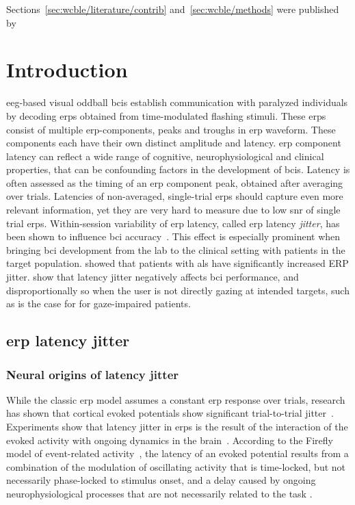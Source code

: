 Sections~\ref{sec:wcble/literature/contrib} and~\ref{sec:wcble/methods} were published
by~\textcite{VanDenKerchove2024}

\section{Introduction}
\label{sec:wcble/intro}

\Ac{eeg}-based visual oddball \acp{bci} establish communication with paralyzed
individuals by decoding \acp{erp} obtained from time-modulated flashing
stimuli.
These \acp{erp} consist of multiple \ac{erp}-components, peaks and troughs in
\ac{erp} waveform.
These components each have their own distinct amplitude and latency.
\Ac{erp} component latency can reflect a wide range of cognitive,
neurophysiological and clinical properties, that can be confounding factors in
the development of \acp{bci}.
Latency is often assessed as the timing of an \ac{erp} component peak, obtained
after averaging over trials.
Latencies of non-averaged, single-trial \acp{erp} should capture even more
relevant information, yet they are very hard to measure due to low \ac{snr} of
single trial \acp{erp}.
Within-session variability of \ac{erp} latency, called \ac{erp} latency
\emph{jitter}, has been shown to influence \ac{bci}
accuracy~\cite{Thompson2012}.
This effect is especially prominent when bringing \ac{bci} development from the
lab to the clinical setting with patients in the target population.
\textcite{Zisk2021} showed that patients with \ac{als} have significantly
increased ERP jitter.
\textcite{Arico2014} show that latency jitter negatively affects \ac{bci}
performance, and disproportionally so when the user is not directly gazing at
intended targets, such as is the case for for gaze-impaired patients.

\subsection{\Ac{erp} latency jitter}

\subsubsection{Neural origins of latency jitter}
While the classic \ac{erp} model assumes a constant \ac{erp} response over trials,
research has shown that cortical evoked potentials show significant
trial-to-trial jitter~\cite{Truccolo2002}.
Experiments show that latency jitter in \acp{erp} is the result of the interaction of
the evoked activity with ongoing dynamics in the brain~\cite{Hasenstaub2007,
	Kisley1999, Curto2009, Arieli1996}.
According to the Firefly model of event-related activity~\cite{Burgess2012},
the latency of an evoked potential results from a combination of the modulation
of oscillating activity that is time-locked, but not necessarily phase-locked to stimulus onset,
and a delay caused by ongoing neurophysiological processes that are not necessarily related to the task
\cite{Stokes2016,Mouraux2008}.

